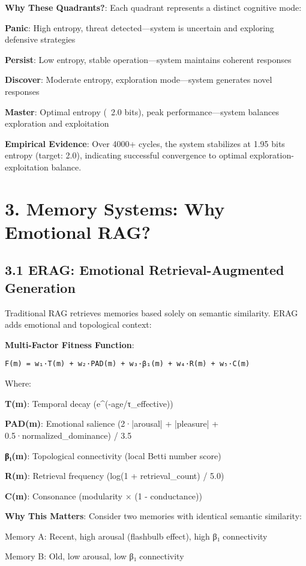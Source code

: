 \documentclass[11pt,a4paper]{article}
\begin{document}
\textbf{Why These Quadrants?}: Each quadrant represents a distinct cognitive mode:
\item \textbf{Panic}: High entropy, threat detected—system is uncertain and exploring defensive strategies
\item \textbf{Persist}: Low entropy, stable operation—system maintains coherent responses
\item \textbf{Discover}: Moderate entropy, exploration mode—system generates novel responses
\item \textbf{Master}: Optimal entropy (~2.0 bits), peak performance—system balances exploration and exploitation

\textbf{Empirical Evidence}: Over 4000+ cycles, the system stabilizes at 1.95 bits entropy (target: 2.0), indicating successful convergence to optimal exploration-exploitation balance.

\section{3. Memory Systems: Why Emotional RAG?}

\subsection{3.1 ERAG: Emotional Retrieval-Augmented Generation}

Traditional RAG retrieves memories based solely on semantic similarity. ERAG adds emotional and topological context:

\textbf{Multi-Factor Fitness Function}:
\begin{verbatim}F(m) = w₁·T(m) + w₂·PAD(m) + w₃·β₁(m) + w₄·R(m) + w₅·C(m)
\end{verbatim}

Where:
\item \textbf{T(m)}: Temporal decay (e^(-age/τ_effective))
\item \textbf{PAD(m)}: Emotional salience (2·|arousal| + |pleasure| + 0.5·normalized_dominance) / 3.5
\item \textbf{β₁(m)}: Topological connectivity (local Betti number score)
\item \textbf{R(m)}: Retrieval frequency (log(1 + retrieval_count) / 5.0)
\item \textbf{C(m)}: Consonance (modularity × (1 - conductance))

\textbf{Why This Matters}: Consider two memories with identical semantic similarity:
\item Memory A: Recent, high arousal (flashbulb effect), high β₁ connectivity
\item Memory B: Old, low arousal, low β₁ connectivity
\end{document}
